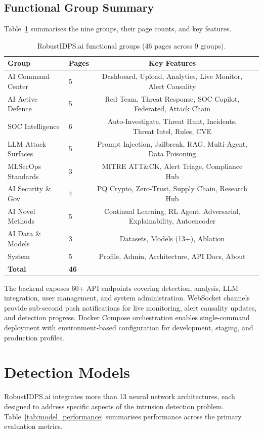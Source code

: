 \documentclass[11pt,a4paper]{article}
\begin{document}
\subsection{Functional Group Summary}
Table~\ref{tab:groups} summarises the nine groups, their page counts, and key features.
\begin{table}[H]
\centering
\caption{RobustIDPS.ai functional groups (46 pages across 9 groups).}
\label{tab:groups}
\small
\begin{tabular}{@{}llcl@{}}
\toprule
\textbf{Group} & \textbf{Pages} & \textbf{Key Features} \\
\midrule
AI Command Center     & 5 & Dashboard, Upload, Analytics, Live Monitor, Alert Causality \\
AI Active Defence     & 5 & Red Team, Threat Response, SOC Copilot, Federated, Attack Chain \\
SOC Intelligence      & 6 & Auto-Investigate, Threat Hunt, Incidents, Threat Intel, Rules, CVE \\
LLM Attack Surfaces   & 5 & Prompt Injection, Jailbreak, RAG, Multi-Agent, Data Poisoning \\
MLSecOps Standards    & 3 & MITRE ATT\&CK, Alert Triage, Compliance Hub \\
AI Security \& Gov    & 4 & PQ Crypto, Zero-Trust, Supply Chain, Research Hub \\
AI Novel Methods      & 5 & Continual Learning, RL Agent, Adversarial, Explainability, Autoencoder \\
AI Data \& Models     & 3 & Datasets, Models (13+), Ablation \\
System                & 5 & Profile, Admin, Architecture, API Docs, About \\
\midrule
\textbf{Total}        & \textbf{46} & \\
\bottomrule
\end{tabular}
\end{table}
The backend exposes 60+ API endpoints covering detection, analysis, LLM integration, user management, and system administration.  WebSocket channels provide sub-second push notifications for live monitoring, alert causality updates, and detection progress.  Docker Compose orchestration enables single-command deployment with environment-based configuration for development, staging, and production profiles.
\section{Detection Models}
\label{sec:models}
RobustIDPS.ai integrates more than 13 neural network architectures, each designed to address specific aspects of the intrusion detection problem.  Table~\ref{tab:model_performance} summarises performance across the primary evaluation metrics.
\end{document}
